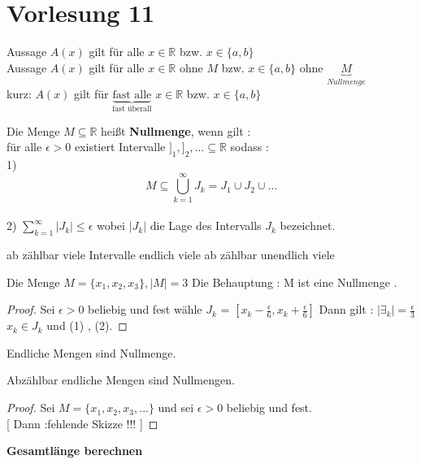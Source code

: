 \section{Vorlesung 11}
\begin{remark}
Aussage $A(x)$ gilt für alle $x \in \mathbb{R}$ bzw. $x \in \{ a , b\}$\\
Aussage $A(x)$ gilt für alle $x \in \mathbb{R}$ ohne $ M$ bzw. $x \in \{ a , b \}$ ohne $\underbrace{M}_{Nullmenge} $\\
kurz: $A(x)$ gilt für $\underbrace{\text{fast alle}}_{\text{fast überall} }$ $x \in \mathbb{R}$ bzw. $x \in \{ a , b\} $  
\end{remark}
\begin{definition}[Nullmenge]
Die Menge $M \subseteq \mathbb{R}$ heißt \textbf{Nullmenge}, wenn gilt :\\
für alle $\epsilon > 0$ existiert Intervalle $ ]_1 , ]_2 , \dots \subseteq \mathbb{R}$ sodass :\\
1) $$ M \subseteq \bigcup_{k=1}^{\infty} J_k = J_1 \cup J_2 \cup \dots $$\\
2) $ \sum_{k=1}^{\infty}|J_k| \leq \epsilon$ wobei $|J_k|$ die Lage des Intervalls $J_k$ bezeichnet.
\end{definition}
\begin{remark}
ab zählbar viele Intervalle endlich viele
ab zählbar unendlich viele
\end{remark}
\begin{example}[1] 
Die Menge $ M = \{ x_1 , x_2 , x_3 \}, |M| = 3$ Die Behauptung : M ist eine Nullmenge .  
\end{example}
\begin{proof}
Sei $\epsilon > 0 $ beliebig und fest 
wähle $J_k$ = $[x_k - \frac{\epsilon}{6}, x_k + \frac{\epsilon}{6}]$
Dann gilt : $|\exists_k|=\frac{\epsilon}{3}$  $x_k \in J_k$ und (1) , (2).
\end{proof}  
\begin{remark}
Endliche Mengen sind Nullmenge.
\end{remark}
\begin{remark}
Abzählbar endliche Mengen sind Nullmengen.
\end{remark}
\begin{proof}
Sei $ M = \{ x_1 , x_2 , x_3 , \dots \}$ und sei $\epsilon > 0 $ beliebig und fest.\\



[ Dann :fehlende Skizze !!! ]
\end{proof}
\textbf{Gesamtlänge berechnen}
